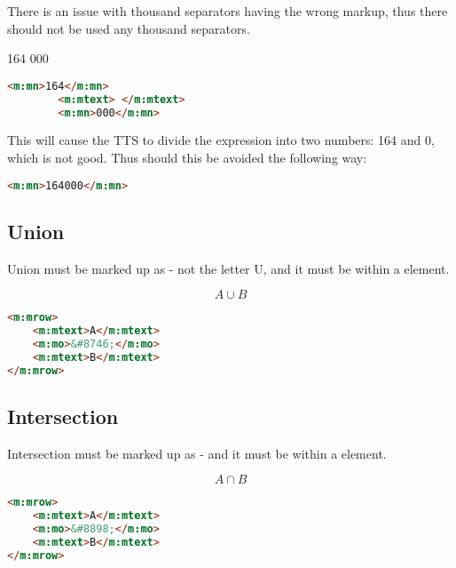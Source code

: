 \documentclass[english,a4paper,11pt]{article}
\begin{document}
There is an issue with thousand separators having the wrong markup, thus there should not be used any thousand separators.

\begin{eksempler}
	\textsc{164 000}
	\begin{lstlisting}[language=HTML, caption={\textbf{Invalid markup}}]
		<m:mn>164</m:mn>
		<m:mtext> </m:mtext>
		<m:mn>000</m:mn> 
	\end{lstlisting}
	
	This will cause the TTS to divide the expression into two numbers: 164 and 0, which is not good. Thus should this be avoided the following way:
	\begin{lstlisting}[language=HTML, caption={Valid markup}]
		<m:mn>164000</m:mn>
	\end{lstlisting}
\end{eksempler}

\subsection{Union}

Union must be marked up as  - not the letter U, and it must be within a  element. 

\begin{eksempler}
\begin{equation}
	A \cup B
\end{equation}
\begin{lstlisting}[language=HTML]
<m:mrow>
	<m:mtext>A</m:mtext>
	<m:mo>&#8746;</m:mo>
	<m:mtext>B</m:mtext>
</m:mrow>
\end{lstlisting}
\end{eksempler}

\subsection{Intersection}

Intersection must be marked up as  - and it must be within a  element. 

\begin{eksempler}
\begin{equation}
	A \cap B
\end{equation}
\begin{lstlisting}[language=HTML]
<m:mrow>
	<m:mtext>A</m:mtext>
	<m:mo>&#8898;</m:mo>
	<m:mtext>B</m:mtext>
</m:mrow>
\end{lstlisting}
\end{eksempler}
\end{document}
